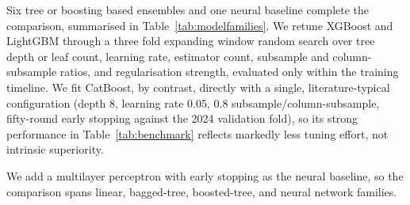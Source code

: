 \documentclass[runningheads]{llncs}
\begin{document}
Six tree or boosting based ensembles and one neural baseline complete the comparison, summarised in Table~\ref{tab:modelfamilies}. We retune XGBoost and LightGBM through a three fold expanding window random search over tree depth or leaf count, learning rate, estimator count, subsample and column-subsample ratios, and regularisation strength, evaluated only within the training timeline. We fit CatBoost, by contrast, directly with a single, literature-typical configuration (depth 8, learning rate 0.05, 0.8 subsample/column-subsample, fifty-round early stopping against the 2024 validation fold), so its strong performance in Table~\ref{tab:benchmark} reflects markedly less tuning effort, not intrinsic superiority.

\begin{table}[H]
\centering
\small
\caption{The six tree or boosting ensembles and one neural baseline benchmarked alongside Linear Regression and the two Seasonal Naive references.}
\label{tab:modelfamilies}
\end{table}

We add a multilayer perceptron with early stopping as the neural baseline, so the comparison spans linear, bagged-tree, boosted-tree, and neural network families.
\end{document}
